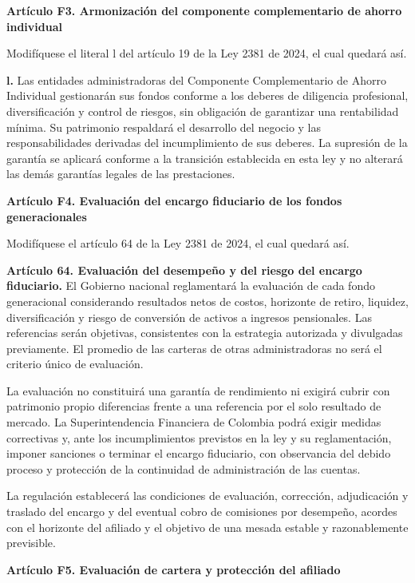 \textbf{Artículo F3. Armonización del componente complementario de ahorro individual}\par\nobreak

Modifíquese el literal l del artículo 19 de la Ley 2381 de 2024, el cual quedará así.

\textbf{l.} Las entidades administradoras del Componente Complementario de Ahorro Individual gestionarán sus fondos conforme a los deberes de diligencia profesional, diversificación y control de riesgos, sin obligación de garantizar una rentabilidad mínima. Su patrimonio respaldará el desarrollo del negocio y las responsabilidades derivadas del incumplimiento de sus deberes. La supresión de la garantía se aplicará conforme a la transición establecida en esta ley y no alterará las demás garantías legales de las prestaciones.

\textbf{Artículo F4. Evaluación del encargo fiduciario de los fondos generacionales}\par\nobreak

Modifíquese el artículo 64 de la Ley 2381 de 2024, el cual quedará así.

\textbf{Artículo 64. Evaluación del desempeño y del riesgo del encargo fiduciario.} El Gobierno nacional reglamentará la evaluación de cada fondo generacional considerando resultados netos de costos, horizonte de retiro, liquidez, diversificación y riesgo de conversión de activos a ingresos pensionales. Las referencias serán objetivas, consistentes con la estrategia autorizada y divulgadas previamente. El promedio de las carteras de otras administradoras no será el criterio único de evaluación.

La evaluación no constituirá una garantía de rendimiento ni exigirá cubrir con patrimonio propio diferencias frente a una referencia por el solo resultado de mercado. La Superintendencia Financiera de Colombia podrá exigir medidas correctivas y, ante los incumplimientos previstos en la ley y su reglamentación, imponer sanciones o terminar el encargo fiduciario, con observancia del debido proceso y protección de la continuidad de administración de las cuentas.

La regulación establecerá las condiciones de evaluación, corrección, adjudicación y traslado del encargo y del eventual cobro de comisiones por desempeño, acordes con el horizonte del afiliado y el objetivo de una mesada estable y razonablemente previsible.

\textbf{Artículo F5. Evaluación de cartera y protección del afiliado}\par\nobreak

